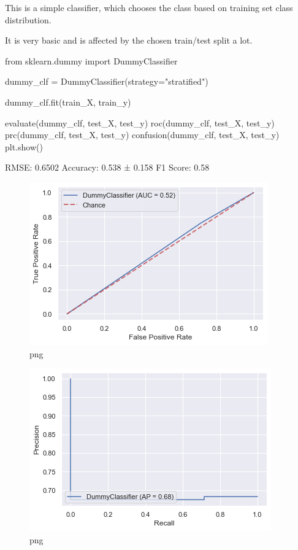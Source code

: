 \documentclass[]{article}
\newenvironment{Shaded}{}{}
\newcommand{\ImportTok}[1]{#1}
\newcommand{\NormalTok}[1]{#1}
\newcommand{\OperatorTok}[1]{\textcolor[rgb]{0.40,0.40,0.40}{#1}}
\newcommand{\StringTok}[1]{\textcolor[rgb]{0.25,0.44,0.63}{#1}}
\begin{document}
This is a simple classifier, which chooses the class based on training
set class distribution.

It is very basic and is affected by the chosen train/test split a lot.

\begin{Shaded}
\begin{Highlighting}[]
\ImportTok{from}\NormalTok{ sklearn.dummy }\ImportTok{import}\NormalTok{ DummyClassifier}

\NormalTok{dummy_clf }\OperatorTok{=}\NormalTok{ DummyClassifier(strategy}\OperatorTok{=}\StringTok{"stratified"}\NormalTok{)}

\NormalTok{dummy_clf.fit(train_X, train_y)}

\NormalTok{evaluate(dummy_clf, test_X, test_y)}
\NormalTok{roc(dummy_clf, test_X, test_y)}
\NormalTok{prc(dummy_clf, test_X, test_y)}
\NormalTok{confusion(dummy_clf, test_X, test_y)}
\NormalTok{plt.show()}
\end{Highlighting}
\end{Shaded}

RMSE: 0.6502 Accuracy: 0.538 ± 0.158 F1 Score: 0.58

\begin{figure}
\centering
\includegraphics{notebook_files/notebook_41_1.png}
\caption{png}
\end{figure}

\begin{figure}
\centering
\includegraphics{notebook_files/notebook_41_2.png}
\caption{png}
\end{figure}
\end{document}
